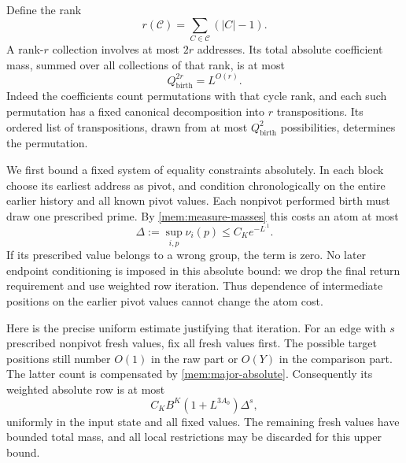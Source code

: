 Define the rank
\begin{equation}\label{mem:rank-definition}
 r(\mathcal C)=\sum_{C\in\mathcal C}(|C|-1).
\end{equation}
A rank-$r$ collection involves at most $2r$ addresses. Its total
absolute coefficient mass, summed over all collections of that rank,
is at most
\begin{equation}\label{mem:rank-coefficients}
 Q_{\mathrm{birth}}^{2r}=L^{O(r)}.
\end{equation}
Indeed the coefficients count permutations with that cycle rank,
and each such permutation has a fixed canonical decomposition into
$r$ transpositions. Its ordered list of transpositions, drawn from
at most $Q_{\mathrm{birth}}^2$ possibilities, determines the
permutation.

We first bound a fixed system of equality constraints absolutely.
In each block choose its earliest address as pivot, and condition
chronologically on the entire earlier history and all known pivot
values. Each nonpivot performed birth must draw one prescribed prime.
By \eqref{mem:measure-masses} this costs an atom at most
\begin{equation}\label{mem:atom}
 \Delta:=\sup_{i,p}\nu_i(p)\le C_K e^{-L^{.1}}.
\end{equation}
If its prescribed value belongs to a wrong group, the term is zero.
No later endpoint conditioning is imposed in this absolute bound:
we drop the final return requirement and use weighted row iteration.
Thus dependence of intermediate positions on the earlier pivot
values cannot change the atom cost.

Here is the precise uniform estimate justifying that iteration.
For an edge with $s$ prescribed nonpivot fresh values, fix all fresh
values first. The possible target positions still number $O(1)$ in
the raw part or $O(Y)$ in the comparison part. The latter count is
compensated by \eqref{mem:major-absolute}. Consequently its weighted
absolute row is at most
\begin{equation}\label{mem:edge-atoms}
 C_K B^K(1+L^{3A_0})\Delta^s,
\end{equation}
uniformly in the input state and all fixed values. The remaining fresh
values have bounded total mass, and all local restrictions may be
discarded for this upper bound.

